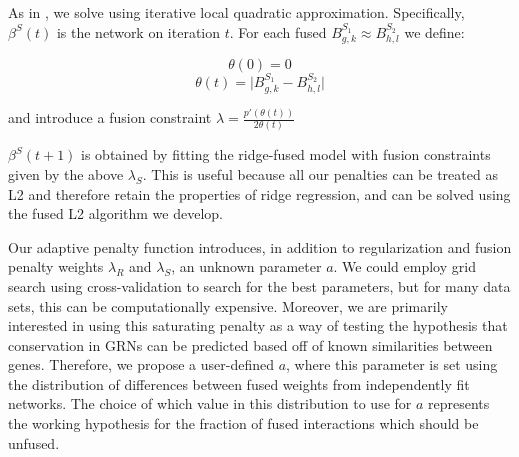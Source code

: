 \documentclass[11pt]{article}
\begin{document}
As in \cite{fan2001variable}, we solve using iterative local quadratic approximation. Specifically, $\beta^S(t)$ is the network on iteration $t$. For each fused $B^{S_1}_{g,k} \approx B^{S_2}_{h,l}$ we define:

\begin{equation} 
\theta(0)=0
\end{equation}
\begin{equation}
\theta(t) = \vert B^{S_1}_{g,k} - B^{S_2}_{h,l} \vert
\end{equation}

and introduce a fusion constraint $\lambda = \frac{p'(\theta(t))}{2\theta(t)} $

$\beta^S(t+1)$ is obtained by fitting the ridge-fused model with fusion constraints given by the above $\lambda_S$. This is useful because all our penalties can be treated as L2 and therefore retain the properties of ridge regression, and can be solved using the fused L2 algorithm we develop.

Our adaptive penalty function introduces, in addition to regularization and fusion penalty weights $\lambda_R$ and $\lambda_S$, an unknown parameter $a$.
We could employ grid search using cross-validation to search for the best parameters, but for many data sets, this can be computationally expensive. 
Moreover, we are primarily interested in using this saturating penalty as a way of testing the hypothesis that conservation in GRNs can be predicted based off of known similarities between genes. 
Therefore, we propose a user-defined $a$, where this parameter is set using the distribution of differences between fused weights from independently fit networks. The choice of which value in this distribution to use for $a$ represents the working hypothesis for the fraction of fused interactions which should be unfused.
\end{document}
